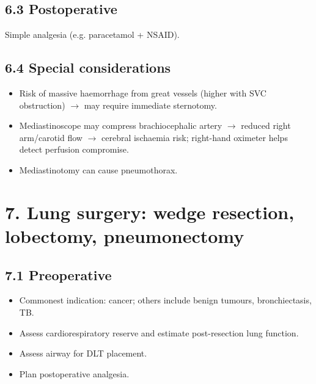 \documentclass[11pt,a4paper]{article}
\begin{document}
\subsection{6.3 Postoperative}
Simple analgesia (e.g. paracetamol + NSAID).

\subsection{6.4 Special considerations}
\begin{itemize}[leftmargin=*, itemsep=2pt]
  \item Risk of massive haemorrhage from great vessels (higher with SVC obstruction) \(\rightarrow\) may require immediate sternotomy.
  \item Mediastinoscope may compress brachiocephalic artery \(\rightarrow\) reduced right arm/carotid flow \(\rightarrow\) cerebral ischaemia risk; right-hand oximeter helps detect perfusion compromise.
  \item Mediastinotomy can cause pneumothorax.
\end{itemize}

\section{7. Lung surgery: wedge resection, lobectomy, pneumonectomy}

\subsection{7.1 Preoperative}
\begin{itemize}[leftmargin=*, itemsep=2pt]
  \item Commonest indication: cancer; others include benign tumours, bronchiectasis, TB.
  \item Assess cardiorespiratory reserve and estimate post-resection lung function.
  \item Assess airway for DLT placement.
  \item Plan postoperative analgesia.
\end{itemize}
\end{document}
